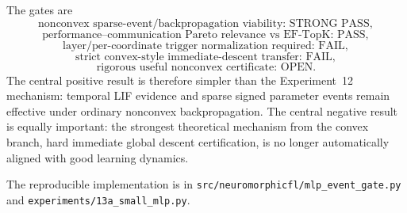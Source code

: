 The gates are
\begin{equation}
  \boxed{\text{nonconvex sparse-event/backpropagation viability: STRONG PASS}},
\end{equation}
\begin{equation}
  \boxed{\text{performance--communication Pareto relevance vs EF-TopK: PASS}},
\end{equation}
\begin{equation}
  \boxed{\text{layer/per-coordinate trigger normalization required: FAIL}},
\end{equation}
\begin{equation}
  \boxed{\text{strict convex-style immediate-descent transfer: FAIL}},
\end{equation}
\begin{equation}
  \boxed{\text{rigorous useful nonconvex certificate: OPEN}}.
\end{equation}
The central positive result is therefore simpler than the Experiment~12 mechanism: temporal LIF evidence and sparse signed parameter events remain effective under ordinary nonconvex backpropagation. The central negative result is equally important: the strongest theoretical mechanism from the convex branch, hard immediate global descent certification, is no longer automatically aligned with good learning dynamics.

The reproducible implementation is in \texttt{src/neuromorphicfl/mlp\_event\_gate.py} and \texttt{experiments/13a\_small\_mlp.py}.
